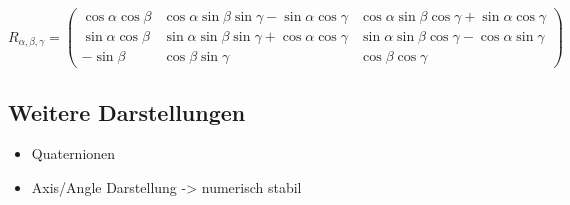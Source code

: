 \begin{equation}
R_{\alpha, \beta, \gamma} %
=
\left(
\begin{array}{ccc}
\cos{\alpha}\cos{\beta} & \cos{\alpha}\sin{\beta}\sin{\gamma} - \sin{\alpha}\cos{\gamma}  & \cos{\alpha}\sin{\beta}\cos{\gamma} + \sin{\alpha}\cos{\gamma} \\
\sin{\alpha}\cos{\beta} & \sin{\alpha}\sin{\beta}\sin{\gamma} + \cos{\alpha}\cos{\gamma} & \sin{\alpha}\sin{\beta}\cos{\gamma} - \cos{\alpha}\sin{\gamma}  \\
-\sin{\beta}	   & \cos{\beta}\sin{\gamma}    &   \cos{\beta}\cos{\gamma}
\end{array}
\right)	
\end{equation}


\subsection{Weitere Darstellungen}
\begin{itemize}
	\item Quaternionen \cite{quaternionen}
	\item Axis/Angle Darstellung \cite{axis-angle} -> numerisch stabil
\end{itemize}

